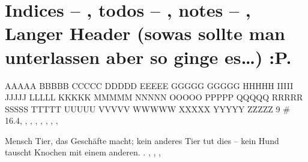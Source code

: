 \chapter{Indices -- \texorpdfstring{}{imakeidx}, todos -- \texorpdfstring{}{todonotes}, notes -- \texorpdfstring{}{scrlayer-notecolumn}, Langer Header (sowas sollte man unterlassen aber so ginge es\ldots{}) :P.}%
\label{chap:IndicesTodosNotes}%
AAAAA
BBBBB
CCCCC
DDDDD
EEEEE
GGGGG
GGGGG
HHHHH
IIIII
JJJJJ
LLLLL
KKKKK
MMMMM
NNNNN
OOOOO
PPPPP
QQQQQ
RRRRR
SSSSS
TTTTT
UUUUU
VVVVV
WWWWW
XXXXX
YYYYY
ZZZZZ
9
\#\index{\#} \num{16.4}, , , 
\index{\LaTeX}, %
, %
, ,  
, \index{+!}%

 Mensch   Tier, das Geschäfte macht; kein anderes Tier tut dies -- kein Hund tauscht Knochen mit einem anderen. \cite{LabenbacherTeX}. , , , %

